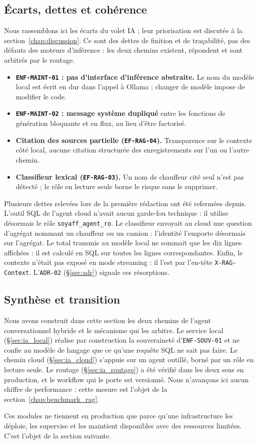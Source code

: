 \subsection{Écarts, dettes et cohérence}
\label{sec:ia_dettes}

Nous rassemblons ici les écarts du volet IA ; leur priorisation est discutée à la section~\ref{chap:discussion}. Ce sont des dettes de finition et de traçabilité, pas des défauts des moteurs d'inférence : les deux chemins existent, répondent et sont arbitrés par le routage.

\begin{itemize}
    \item \textbf{\texttt{ENF-MAINT-01} : pas d'interface d'inférence abstraite.} Le nom du modèle local est écrit en dur dans l'appel à Ollama ; changer de modèle impose de modifier le code.
    \item \textbf{\texttt{ENF-MAINT-02} : message système dupliqué} entre les fonctions de génération bloquante et en flux, au lieu d'être factorisé.
    \item \textbf{Citation des sources partielle (\texttt{EF-RAG-04}).} Transparence sur le contexte côté local, aucune citation structurée des enregistrements sur l'un ou l'autre chemin.
    \item \textbf{Classifieur lexical (\texttt{EF-RAG-03}).} Un nom de chauffeur cité seul n'est pas détecté ; le rôle en lecture seule borne le risque sans le supprimer.
\end{itemize}

Plusieurs dettes relevées lors de la première rédaction ont été refermées depuis. L'outil SQL de l'agent cloud n'avait aucun garde-fou technique : il utilise désormais le rôle \texttt{soyaff\_agent\_ro}. Le classifieur envoyait au cloud une question d'agrégat nommant un chauffeur ou un camion : l'identité l'emporte désormais sur l'agrégat. Le total transmis au modèle local ne sommait que les dix lignes affichées : il est calculé en SQL sur toutes les lignes correspondantes. Enfin, le contexte n'était pas exposé en mode streaming : il l'est par l'en-tête \texttt{X-RAG-Context}. L'\texttt{ADR-02} (\S\ref{sec:adr}) signale ces résorptions.

\subsection{Synthèse et transition}

Nous avons construit dans cette section les deux chemins de l'agent conversationnel hybride et le mécanisme qui les arbitre. Le service local (\S\ref{sec:ia_local}) réalise par construction la souveraineté d'\texttt{ENF-SOUV-01} et ne confie au modèle de langage que ce qu'une requête SQL ne sait pas faire. Le chemin cloud (\S\ref{sec:ia_cloud}) s'appuie sur un agent outillé, borné par un rôle en lecture seule. Le routage (\S\ref{sec:ia_routage}) a été vérifié dans les deux sens en production, et le workflow qui le porte est versionné. Nous n'avançons ici aucun chiffre de performance : cette mesure est l'objet de la section~\ref{chap:benchmark_rag}.

Ces modules ne tiennent en production que parce qu'une infrastructure les déploie, les supervise et les maintient disponibles avec des ressources limitées. C'est l'objet de la section suivante.
